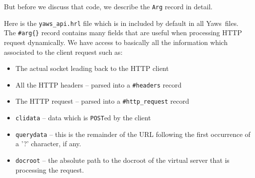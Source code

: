 \documentclass[11pt,oneside,english]{book}
\newcommand{\Yaws}            %
        {{\sc Yaws}}
\begin{document}
But before we discuss that code, we describe the \verb+Arg+ record
in detail.

Here is the \verb+yaws_api.hrl+ file which is in included by default
in all \Yaws\ files. The \verb+#arg{}+ record contains many fields
that are useful when processing HTTP request dynamically.  We have
access to basically all the information which associated to the client
request such as:

\begin{itemize}

\item The actual socket leading back to the HTTP client
\item All the HTTP headers -- parsed into a \verb+#headers+ record
\item The HTTP request -- parsed into a \verb+#http_request+ record
\item \verb+clidata+ -- data which is \verb+POST+ed by the client
\item \verb+querydata+ -- this is the remainder of the URL following
  the first occurrence of a '?' character, if any.
\item \verb+docroot+ -- the absolute path to the docroot of the
  virtual server that is processing the request.
\end{itemize}
\end{document}
